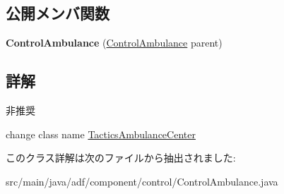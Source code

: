 \subsection*{公開メンバ関数}
\begin{DoxyCompactItemize}
\item 
\hypertarget{classadf_1_1component_1_1control_1_1ControlAmbulance_ade5e6a6110e83443fbef51dec9d2723b}{}\label{classadf_1_1component_1_1control_1_1ControlAmbulance_ade5e6a6110e83443fbef51dec9d2723b} 
{\bfseries Control\+Ambulance} (\hyperlink{classadf_1_1component_1_1control_1_1ControlAmbulance}{Control\+Ambulance} parent)
\end{DoxyCompactItemize}


\subsection{詳解}
\begin{DoxyRefDesc}{非推奨}
\item[\hyperlink{deprecated__deprecated000010}{非推奨}]change class name \hyperlink{}{Tactics\+Ambulance\+Center} \end{DoxyRefDesc}


このクラス詳解は次のファイルから抽出されました\+:\begin{DoxyCompactItemize}
\item 
src/main/java/adf/component/control/Control\+Ambulance.\+java\end{DoxyCompactItemize}

